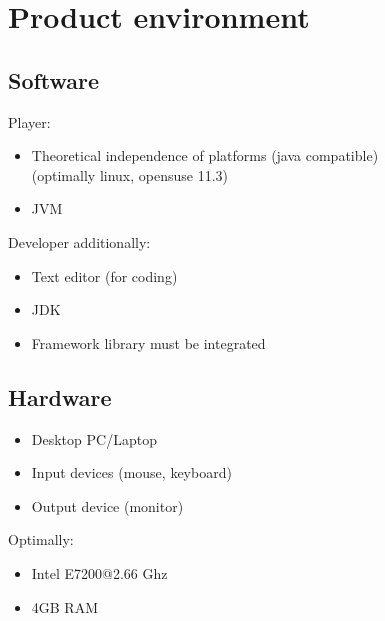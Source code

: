 \section{Product environment}

\subsection{Software}
Player:
\begin{itemize}
	\item Theoretical independence of platforms (\Gls{java} compatible) \\ 
		(optimally \gls{linux}, \gls{opensuse} 11.3)
	\item \Gls{JVM}
\end{itemize}

Developer additionally:
\begin{itemize}
	\item Text editor (for coding)
	\item \Gls{JDK}
	\item Framework library must be integrated
\end{itemize}

\subsection{Hardware}
\begin{itemize}
	\item Desktop PC/Laptop
	\item Input devices (mouse, keyboard)
	\item Output device (monitor)
\end{itemize}

Optimally:
\begin{itemize}
	\item Intel E7200@2.66 Ghz
	\item 4GB RAM
\end{itemize}